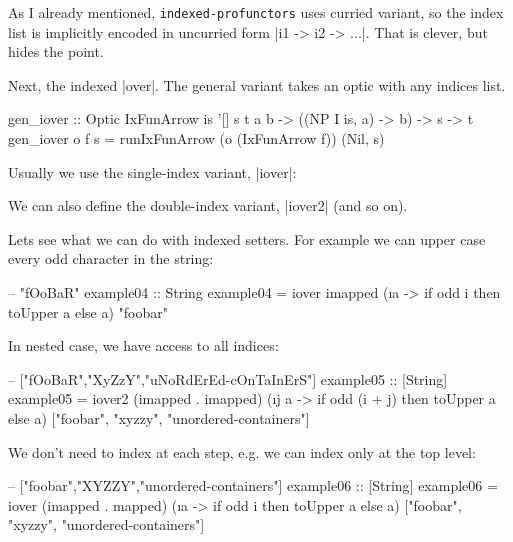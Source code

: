 As I already mentioned, \texttt{indexed-profunctors} uses curried
variant, so the index list is implicitly encoded in uncurried
form |i1 -> i2 -> ...|.
That is clever, but hides the point.

Next, the indexed |over|.
The general variant takes an optic with any indices list.

\begin{code}
gen_iover :: Optic IxFunArrow is '[] s t a b
         -> ((NP I is, a) -> b)
         -> s -> t
gen_iover o f s = runIxFunArrow (o (IxFunArrow f)) (Nil, s)
\end{code}

Usually we use the single-index variant, |iover|:


We can also define the double-index variant, |iover2| (and so on).


Lets see what we can do with indexed setters.
For example we can upper case every odd character in the string:

\begin{code}
-- "fOoBaR"
example04 :: String
example04 = iover imapped (\i a -> if odd i then toUpper a else a) "foobar"
\end{code}

In nested case, we have access to all indices:

\begin{code}
-- ["fOoBaR","XyZzY","uNoRdErEd-cOnTaInErS"]
example05 :: [String]
example05 = iover2
    (imapped . imapped)
    (\i j a -> if odd (i + j) then toUpper a else a)
    ["foobar", "xyzzy", "unordered-containers"]
\end{code}

We don't need to index at each step,
e.g. we can index only at the top level:

\begin{code}
-- ["foobar","XYZZY","unordered-containers"]
example06 :: [String]
example06 = iover
    (imapped . mapped)
    (\i a -> if odd i then toUpper a else a)
    ["foobar", "xyzzy", "unordered-containers"]
\end{code}

